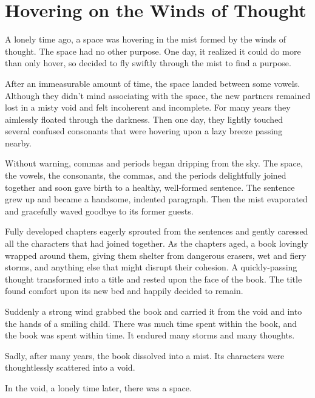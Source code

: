 \chapter{Hovering on the Winds of Thought}
\setlength{\parindent}{2em}
\LARGE
\pagestyle{myheadings}

A lonely time ago, a space was hovering in the mist formed by the winds of thought. The space had no other purpose. One day, it realized it could do more than only hover, so decided to fly swiftly through the mist to find a purpose.

After an immeasurable amount of time, the space landed between some vowels. Although they didn't mind associating with the space, the new partners remained lost in a misty void and felt incoherent and incomplete. For many years they aimlessly floated through the darkness. Then one day, they lightly touched several confused consonants that were hovering upon a lazy breeze passing nearby.

Without warning, commas and periods began dripping from the sky. The space, the vowels, the consonants, the commas, and the periods delightfully joined together and soon gave birth to a healthy, well-formed sentence. The sentence grew up and became a handsome, indented paragraph. Then the mist evaporated and gracefully waved goodbye to its former guests.

Fully developed chapters eagerly sprouted from the sentences and gently caressed all the characters that had joined together. As the chapters aged, a book lovingly wrapped around them, giving them shelter from dangerous erasers, wet and fiery storms, and anything else that might disrupt their cohesion. A quickly-passing thought transformed into a title and rested upon the face of the book. The title found comfort upon its new bed and happily decided to remain.

Suddenly a strong wind grabbed the book and carried it from the void and into the hands of a smiling child. There was much time spent within the book, and the book was spent within time. It endured many storms and many thoughts.

Sadly, after many years, the book dissolved into a mist. Its characters were thoughtlessly scattered into a void.

In the void, a lonely time later, there was a space.
